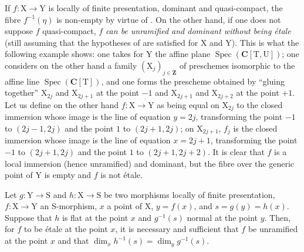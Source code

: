 \begin{remark}[18.10.3.1]
\label{IV.18.10.3.1}
If $f:\mathrm{X}\to\mathrm{Y}$ is locally of finite presentation, dominant and quasi-compact, the fibre $f^{-1}(\eta)$ is non-empty by virtue of .
On the other hand, if one does not suppose $f$ quasi-compact, $f$ \emph{can be unramified and dominant without being \'etale} (still assuming that the hypotheses of  are satisfied for $\mathrm{X}$ and $\mathrm{Y}$).
This is what the following example shows: one takes for $\mathrm{Y}$ the affine plane $\operatorname{Spec}(\mathbf{C}[\mathrm{T},\mathrm{U}])$; one considers on the other hand a family $(\mathrm{X}_j)_{j\in\mathbf{Z}}$ of preschemes isomorphic to the affine line $\operatorname{Spec}(\mathbf{C}[\mathrm{T}])$, and one forms the prescheme obtained by ``gluing together'' $\mathrm{X}_{2j}$ and $\mathrm{X}_{2j+1}$ at the point $-1$ and $\mathrm{X}_{2j+1}$ and $\mathrm{X}_{2j+2}$ at the point $+1$.
Let us define on the other hand $f:\mathrm{X}\to\mathrm{Y}$ as being equal on $\mathrm{X}_{2j}$ to the closed immersion whose image is the line of equation $y=2j$, transforming the point $-1$ to $(2j-1,2j)$ and the point $1$ to $(2j+1,2j)$; on $\mathrm{X}_{2j+1}$, $f_j$ is the closed immersion whose image is the line of equation $x=2j+1$, transforming the point $-1$ to $(2j+1,2j)$ and the point $1$ to $(2j+1,2j+2)$.
It is clear that $f$ is a local immersion (hence unramified) and dominant, but the fibre over the generic point of $\mathrm{Y}$ is empty and $f$ is not \'etale.
\end{remark}

\begin{corollary}[18.10.4]
\label{IV.18.10.4}
Let $g:\mathrm{Y}\to\mathrm{S}$ and $h:\mathrm{X}\to\mathrm{S}$ be two morphisms locally of finite presentation, $f:\mathrm{X}\to\mathrm{Y}$ an $\mathrm{S}$-morphism, $x$ a point of $\mathrm{X}$, $y=f(x)$, and $s=g(y)=h(x)$.
Suppose that $h$ is flat at the point $x$ and $g^{-1}(s)$ normal at the point $y$.
Then, for $f$ to be \'etale at the point $x$, it is necessary and sufficient that $f$ be unramified at the point $x$ and that $\dim_xh^{-1}(s)=\dim_yg^{-1}(s)$.
\end{corollary}

